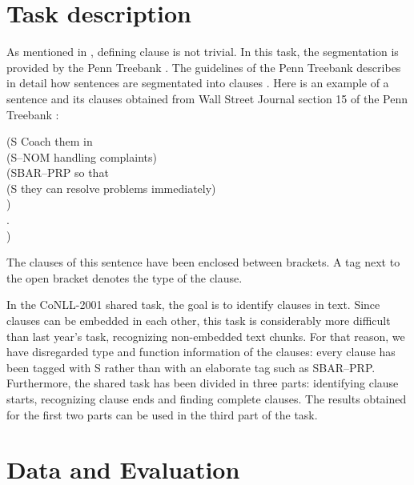 \section{Task description}
\label{sec-task}

As mentioned in \cite{leffa98}, defining clause is not trivial. 
In this task, the segmentation is provided by the Penn Treebank \cite{marcus93}.
The guidelines of the Penn Treebank describes in detail how sentences are segmentated
into clauses \cite{bies95}.
Here is an example of a sentence and its clauses obtained from 
Wall Street Journal section 15 of the Penn Treebank \cite{marcus93}:

\vspace*{\baselineskip}
\noindent
(S Coach them in\\
\hspace*{0.25cm}(S--NOM handling complaints)\\
\hspace*{0.25cm}(SBAR--PRP so that\\
\hspace*{0.50cm}(S they can resolve problems immediately)\\
\hspace*{0.25cm})\\
\hspace*{0.25cm}.\\
)

\vspace*{\baselineskip}
\noindent
The clauses of this sentence have been enclosed between brackets.
A tag next to the open bracket denotes the type of the clause.

In the CoNLL-2001 shared task, the goal is to identify clauses in
text.
Since clauses can be embedded in each other, this task is considerably
more difficult than last year's task, recognizing non-embedded text
chunks.
For that reason, we have disregarded type and function information
of the clauses: every clause has been tagged with S rather
than with an elaborate tag such as SBAR--PRP.
Furthermore, the shared task has been divided in three parts:
identifying clause starts, recognizing clause ends and finding
complete clauses.
The results obtained for the first two parts can be used in the 
third part of the task.

\section{Data and Evaluation}

